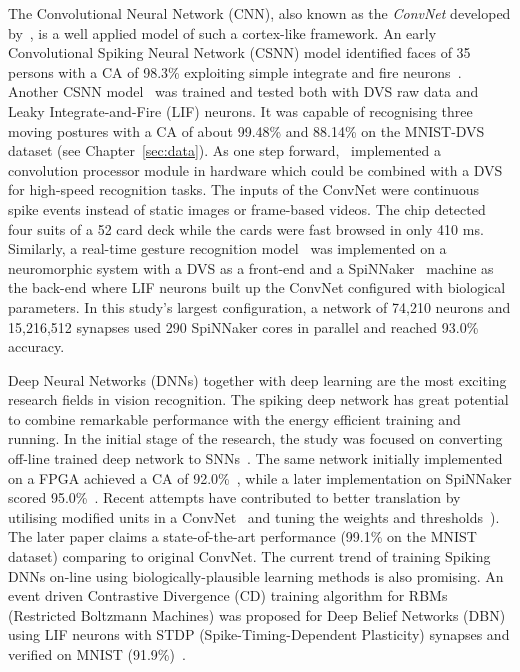 \documentclass{frontiersENG} %
\begin{document}
The Convolutional Neural Network (CNN), also known as the \textit{ConvNet} developed by~\cite{lecun1998gradient}, is a well applied model of such a cortex-like framework.
An early Convolutional Spiking Neural Network (CSNN) model identified faces of 35 persons with a CA of 98.3\% exploiting simple integrate and fire neurons~\citep{matsugu2002convolutional}.
Another CSNN model~\citep{zhao2014feedforward} was trained and tested both with DVS raw data and Leaky Integrate-and-Fire (LIF) neurons.
It was capable of recognising three moving postures with a CA of about 99.48\% and 88.14\% on the MNIST-DVS dataset (see Chapter~\ref{sec:data}).
As one step forward,~\cite{camunas2012event} implemented a convolution processor module in hardware which could be combined with a DVS for high-speed recognition tasks.
The inputs of the ConvNet were continuous spike events instead of static images or frame-based videos. 
The chip detected four suits of a 52 card deck while the cards were fast browsed in only 410 ms.
Similarly, a real-time gesture recognition model~\citep{liu2014real} was implemented on a neuromorphic system with a DVS as a front-end and a SpiNNaker~\citep{furber2014spinnaker} machine as the back-end where LIF neurons built up the ConvNet configured with biological parameters.
In this study's largest configuration, a network of 74,210 neurons and 15,216,512 synapses used 290 SpiNNaker cores in parallel and reached 93.0\% accuracy. 

Deep Neural Networks (DNNs) together with deep learning are the most exciting research fields in vision recognition.
The spiking deep network has great potential to combine remarkable performance with the energy efficient training and running.
In the initial stage of the research, the study was focused on converting off-line trained deep network to SNNs~\citep{o2013real}.
The same network initially implemented on a FPGA achieved a CA of 92.0\%~\citep{neil2014minitaur}, while a later implementation on SpiNNaker scored 95.0\%~\citep{Stromatias2015scalable}.
Recent attempts have contributed to better translation by utilising modified units in a ConvNet~\citep{cao2015spiking} and tuning the weights and thresholds~\citep{Diehl2015fast}).
The later paper claims a state-of-the-art performance (99.1\% on the MNIST dataset) comparing to original ConvNet.
The current trend of training Spiking DNNs on-line using biologically-plausible learning methods is also promising.
An event driven Contrastive Divergence (CD) training algorithm for RBMs (Restricted Boltzmann Machines) was proposed for Deep Belief Networks (DBN) using LIF neurons with STDP (Spike-Timing-Dependent Plasticity) synapses and verified on MNIST (91.9\%)~\citep{neftci2013event}.
\end{document}
